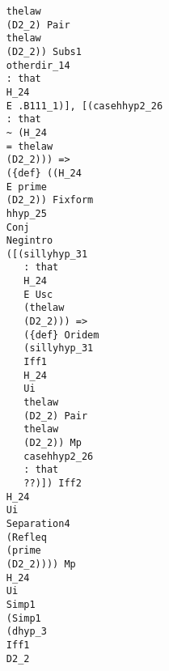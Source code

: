 \documentclass[12pt]{article}
\begin{document}
\begin{verbatim}
                                           thelaw 
                                           (D2_2) Pair 
                                           thelaw 
                                           (D2_2)) Subs1 
                                           otherdir_14 
                                           : that 
                                           H_24 
                                           E .B111_1)], [(casehhyp2_26 
                                           : that 
                                           ~ (H_24 
                                           = thelaw 
                                           (D2_2))) => 
                                           ({def} ((H_24 
                                           E prime 
                                           (D2_2)) Fixform 
                                           hhyp_25 
                                           Conj 
                                           Negintro 
                                           ([(sillyhyp_31 
                                              : that 
                                              H_24 
                                              E Usc 
                                              (thelaw 
                                              (D2_2))) => 
                                              ({def} Oridem 
                                              (sillyhyp_31 
                                              Iff1 
                                              H_24 
                                              Ui 
                                              thelaw 
                                              (D2_2) Pair 
                                              thelaw 
                                              (D2_2)) Mp 
                                              casehhyp2_26 
                                              : that 
                                              ??)]) Iff2 
                                           H_24 
                                           Ui 
                                           Separation4 
                                           (Refleq 
                                           (prime 
                                           (D2_2)))) Mp 
                                           H_24 
                                           Ui 
                                           Simp1 
                                           (Simp1 
                                           (dhyp_3 
                                           Iff1 
                                           D2_2 

\end{verbatim}
\end{document}
